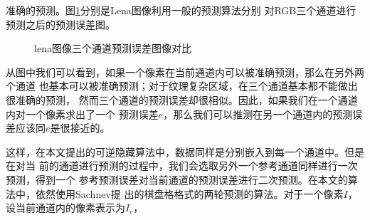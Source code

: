 准确的预测。图\ref{fig:lena_rgb_pe_compare}分别是Lena图像利用一般的预测算法分别
对RGB三个通道进行预测之后的预测误差图。
\begin{figure}[!h]
\centering 
{}
\caption{lena图像三个通道预测误差图像对比}
\label{fig:lena_rgb_pe_compare}
\end{figure}
从图中我们可以看到，如果一个像素在当前通道内可以被准确预测，那么在另外两个通道
也基本可以被准确预测；对于纹理复杂区域，在三个通道基本都不能做出很准确的预测，
然而三个通道的预测误差却很相似。因此，如果我们在一个通道内对一个像素求出了一个
预测误差$e$，那么我们可以推测在另一个通道内的预测误差应该同$e$是很接近的。
\par
这样，在本文提出的可逆隐藏算法中，数据同样是分别嵌入到每一个通道中。但是在对当
前的通道进行预测的过程中，我们会选取另外一个参考通道同样进行一次预测，得到一个
参考预测误差对当前通道的预测误差进行二次预测。在本文的算法中，依然使用Sachnev提
出的棋盘格格式的两轮预测的算法。对于一个像素$I$，设当前通道内的像素表示为$I_c$，
